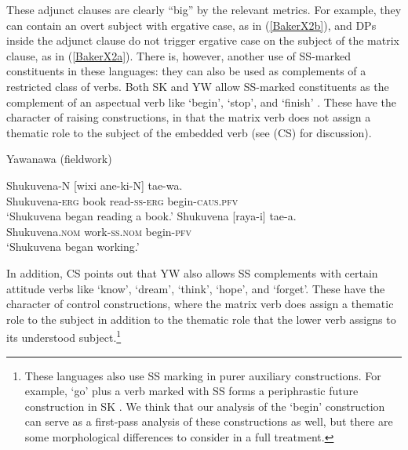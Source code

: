 \documentclass[output=paper]{langscibook}
\begin{document}
These adjunct clauses are clearly “big” by the relevant metrics. For example, they can contain an overt subject with ergative case, as in (\ref{BakerX2b}), and DPs inside the adjunct clause do not trigger ergative case on the subject of the matrix clause, as in (\ref{BakerX2a}). There is, however, another use of SS-marked constituents in these languages: they can also be used as complements of a restricted class of verbs. Both SK and YW allow SS-marked constituents as the complement of an aspectual verb like ‘begin’, ‘stop’, and ‘finish’ \citep[319]{valenzuela2003transitivity}. These have the character of raising constructions, in that the matrix verb does not assign a thematic role to the subject of the embedded verb (see \citealt{camargosouza2020switch} (CS) for discussion).

\begin{exe}
    \ex Yawanawa (fieldwork) \label{BakerX3}
	    \begin{xlist}
			\ex \label{BakerX3a}
			\gll Shukuvena-N [wixi ane-ki-N] tae-wa.\footnotemark\\
			     Shukuvena-\textsc{erg} book read-\textsc{ss-erg} begin-\textsc{caus.pfv}\\
			    \glt `Shukuvena began reading a book.'
			\ex \label{BakerX3b}
			\gll Shukuvena [raya-i] tae-a.\\
    			 Shukuvena.\textsc{nom} work-\textsc{ss.nom} begin-\textsc{pfv}\\
			    \glt `Shukuvena began working.'
		\end{xlist}
\end{exe}

In addition, CS points out that YW also allows SS complements with certain attitude verbs like `know', `dream', `think', `hope', and `forget'. These have the character of control constructions, where the matrix verb does assign a thematic role to the subject in addition to the thematic role that the lower verb assigns to its understood subject.\footnote{These languages also use SS marking in purer auxiliary constructions. For example, `go’ plus a verb marked with SS forms a periphrastic future construction in SK \citep[306]{valenzuela2003transitivity, zariquieybiondi2011}. We think that our analysis of the `begin’ construction can serve as a first-pass analysis of these constructions as well, but there are some morphological differences to consider in a full treatment.}
\end{document}

